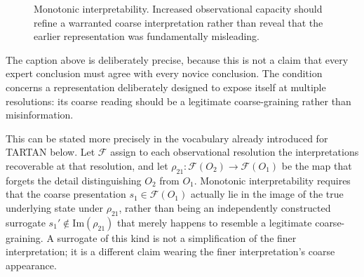 \documentclass[11pt]{article}
\begin{document}
\begin{figure}[ht]
\centering
{}
\caption{Monotonic interpretability. Increased observational capacity should refine a warranted coarse interpretation rather than reveal that the earlier representation was fundamentally misleading.}
\label{fig:monotonic-interpretability}
\end{figure}

The caption above is deliberately precise, because this is not a claim that every expert conclusion must agree with every novice conclusion. The condition concerns a representation deliberately designed to expose itself at multiple resolutions: its coarse reading should be a legitimate coarse-graining rather than misinformation.

This can be stated more precisely in the vocabulary already introduced for TARTAN below. Let $\mathcal{F}$ assign to each observational resolution the interpretations recoverable at that resolution, and let $\rho_{21}: \mathcal{F}(O_2) \to \mathcal{F}(O_1)$ be the map that forgets the detail distinguishing $O_2$ from $O_1$. Monotonic interpretability requires that the coarse presentation $s_1 \in \mathcal{F}(O_1)$ actually lie in the image of the true underlying state under $\rho_{21}$, rather than being an independently constructed surrogate $s_1' \notin \mathrm{Im}(\rho_{21})$ that merely happens to resemble a legitimate coarse-graining. A surrogate of this kind is not a simplification of the finer interpretation; it is a different claim wearing the finer interpretation's coarse appearance.
\end{document}
